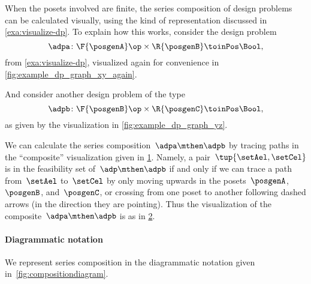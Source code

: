 When the posets involved are finite, the series composition of design problems can be calculated visually, using the kind of representation discussed in \cref{exa:visualize-dp}. To explain how this works, consider the design problem
\begin{equation*}
    \adpa \colon \F{\posgenA} \op \times  \R{\posgenB} \toinPos \Bool,
\end{equation*}
from \cref{exa:visualize-dp}, visualized again for convenience in \cref{fig:example_dp_graph_xy_again}.
\begin{marginfigure}
    \centering
    \caption{ }
    \label{fig:example_dp_graph_xy_again}
\end{marginfigure}
And consider another design problem of the type
\begin{equation*}
    \adpb \colon \F{\posgenB} \op \times  \R{\posgenC} \toinPos \Bool,
\end{equation*}
as given by the visualization in \cref{fig:example_dp_graph_yz}.
\begin{marginfigure}
    \centering
    \caption{ }
    \label{fig:example_dp_graph_yz}
\end{marginfigure}
We can calculate the series composition~$\adpa \mthen \adpb$ by tracing paths in the ``composite'' visualization given in \cref{fig:example_dp_graph_xyz}.
Namely, a pair~$\tup{\setAel, \setCel}$ is in the feasibility set of~$\adp \mthen \adpb$ if and only if we can trace a path from~$\setAel$ to~$\setCel$ by only moving upwards in the posets~$\posgenA$,~$\posgenB$, and~$\posgenC$, or crossing from one poset to another following dashed arrows (in the direction they are pointing).
Thus the visualization of the composite~$\adpa \mthen \adpb$ is as in \cref{fig:example_dp_graph_xz}.
\begin{figure}[h!]
    \centering
    \caption{}
    \label{fig:example_dp_graph_xyz}
\end{figure}
\begin{figure}[h!]
    \centering
    \caption{}
    \label{fig:example_dp_graph_xz}
\end{figure}



\paragraph{Diagrammatic notation}
We represent series composition in the diagrammatic notation given in~\cref{fig:compositiondiagram}.

